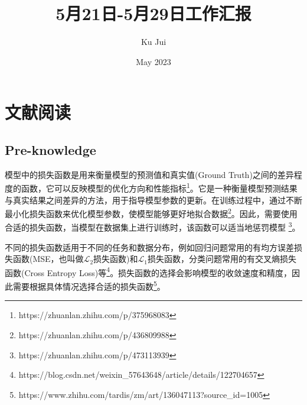 \documentclass[letterpaper,12pt]{article}
\begin{document}
	
	
	\title{\songti {}5月21日-5月29日工作汇报}
	\author{\textrm{Ku Jui}}
	\date{\textrm{May 2023}}
	\maketitle
	
	\renewcommand{\figurename}{Figure} %
	\renewcommand{\contentsname}{Contents}
	
	\tableofcontents  %
	
	\section{文献阅读}
	
	\subsection{Pre-knowledge}
	
	模型中的损失函数是用来衡量模型的预测值和真实值(Ground Truth)之间的差异程度的函数，它可以反映模型的优化方向和性能指标\footnote{https://zhuanlan.zhihu.com/p/375968083}。它是一种衡量模型预测结果与真实结果之间差异的方法，用于指导模型参数的更新。在训练过程中，通过不断最小化损失函数来优化模型参数，使模型能够更好地拟合数据\footnote{https://zhuanlan.zhihu.com/p/436809988}。因此，需要使用合适的损失函数，当模型在数据集上进行训练时，该函数可以适当地惩罚模型 \footnote{https://zhuanlan.zhihu.com/p/473113939}。
	
	不同的损失函数适用于不同的任务和数据分布，例如回归问题常用的有均方误差损失函数(MSE，也叫做$\mathcal{L}_{2}$损失函数)和$\mathcal{L}_{1}$损失函数，分类问题常用的有交叉熵损失函数(Cross Entropy Loss)等\footnote{https://blog.csdn.net/weixin\_57643648/article/details/122704657}。损失函数的选择会影响模型的收敛速度和精度，因此需要根据具体情况选择合适的损失函数\footnote{https://www.zhihu.com/tardis/zm/art/136047113?source\_id=1005}。
	
\end{document}
